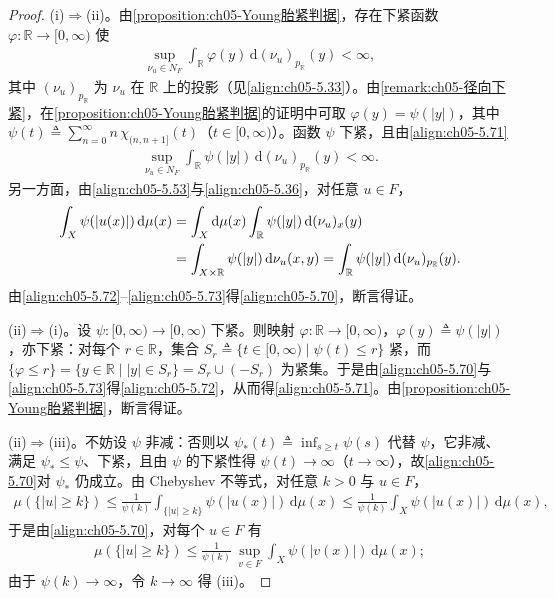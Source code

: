 \documentclass[../../main.tex]{subfiles}%
\begin{document}
\begin{proof}
(i)$\Rightarrow$(ii)。由\cref{proposition:ch05-Young胎紧判据}，存在下紧函数 $\varphi:\mathbb{R}\to[0,\infty)$ 使
\begin{align}
\sup_{\nu_u\in N_F}\int_{\mathbb{R}}\varphi(y)\,\mathrm{d}(\nu_u)_{p_{\mathbb{R}}}(y)<\infty,\label{align:ch05-5.71}
\end{align}
其中 $(\nu_u)_{p_{\mathbb{R}}}$ 为 $\nu_u$ 在 $\mathbb{R}$ 上的投影（见\eqref{align:ch05-5.33}）。由\cref{remark:ch05-径向下紧}，在\cref{proposition:ch05-Young胎紧判据}的证明中可取 $\varphi(y)=\psi(|y|)$，其中 $\psi(t)\triangleq\sum_{n=0}^\infty n\,\chi_{(n,n+1]}(t)$（$t\in[0,\infty)$）。函数 $\psi$ 下紧，且由\eqref{align:ch05-5.71}
\begin{align}
\sup_{\nu_u\in N_F}\int_{\mathbb{R}}\psi(|y|)\,\mathrm{d}(\nu_u)_{p_{\mathbb{R}}}(y)<\infty.\label{align:ch05-5.72}
\end{align}
另一方面，由\eqref{align:ch05-5.53}与\eqref{align:ch05-5.36}，对任意 $u\in F$，
\begin{align}
\int_X\psi(|u(x)|)\,\mathrm{d}\mu(x)
&=\int_X\mathrm{d}\mu(x)\int_{\mathbb{R}}\psi(|y|)\,\mathrm{d}(\nu_u)_x(y)\notag\\
&=\int_{X\times\mathbb{R}}\psi(|y|)\,\mathrm{d}\nu_u(x,y)
=\int_{\mathbb{R}}\psi(|y|)\,\mathrm{d}(\nu_u)_{p_{\mathbb{R}}}(y).\label{align:ch05-5.73}
\end{align}
由\eqref{align:ch05-5.72}–\eqref{align:ch05-5.73}得\eqref{align:ch05-5.70}，断言得证。

(ii)$\Rightarrow$(i)。设 $\psi:[0,\infty)\to[0,\infty)$ 下紧。则映射 $\varphi:\mathbb{R}\to[0,\infty)$，$\varphi(y)\triangleq\psi(|y|)$，亦下紧：对每个 $r\in\mathbb{R}$，集合 $S_r\triangleq\{t\in[0,\infty)\mid\psi(t)\leqslant r\}$ 紧，而 $\{\varphi\leqslant r\}=\{y\in\mathbb{R}\mid|y|\in S_r\}=S_r\cup(-S_r)$ 为紧集。于是由\eqref{align:ch05-5.70}与\eqref{align:ch05-5.73}得\eqref{align:ch05-5.72}，从而得\eqref{align:ch05-5.71}。由\cref{proposition:ch05-Young胎紧判据}，断言得证。

(ii)$\Rightarrow$(iii)。不妨设 $\psi$ 非减：否则以 $\psi_*(t)\triangleq\inf_{s\geqslant t}\psi(s)$ 代替 $\psi$，它非减、满足 $\psi_*\leqslant\psi$、下紧，且由 $\psi$ 的下紧性得 $\psi(t)\to\infty$（$t\to\infty$），故\eqref{align:ch05-5.70}对 $\psi_*$ 仍成立。由 Chebyshev 不等式，对任意 $k>0$ 与 $u\in F$，
\begin{align*}
\mu(\{|u|\geqslant k\})\leqslant\frac{1}{\psi(k)}\int_{\{|u|\geqslant k\}}\psi(|u(x)|)\,\mathrm{d}\mu(x)
\leqslant\frac{1}{\psi(k)}\int_X\psi(|u(x)|)\,\mathrm{d}\mu(x),
\end{align*}
于是由\eqref{align:ch05-5.70}，对每个 $u\in F$ 有
\begin{align*}
\mu(\{|u|\geqslant k\})\leqslant\frac{1}{\psi(k)}\,\sup_{v\in F}\int_X\psi(|v(x)|)\,\mathrm{d}\mu(x);
\end{align*}
由于 $\psi(k)\to\infty$，令 $k\to\infty$ 得 (iii)。


\end{proof}
\end{document}
